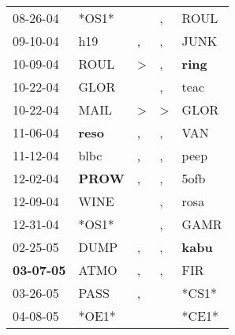 \begin{supertabular}{p{0.07\textwidth}p{0.06\textwidth}p{0.02\textwidth}p{0.02\textwidth}p{0.06\textwidth}}
          08-26-04\textsuperscript{} &                            *OS1* &                  &                , &           ROUL\textsuperscript{} \\
          09-10-04\textsuperscript{} &            h19\textsuperscript{} &                , &                , &           JUNK\textsuperscript{} \\
          10-09-04\textsuperscript{} &           ROUL\textsuperscript{} &     \textgreater &                , &  \textbf{ring\textsuperscript{}} \\
          10-22-04\textsuperscript{} &           GLOR\textsuperscript{} &                  &                , &           teac\textsuperscript{} \\
          10-22-04\textsuperscript{} &           MAIL\textsuperscript{} &     \textgreater &     \textgreater &           GLOR\textsuperscript{} \\
          11-06-04\textsuperscript{} &  \textbf{reso\textsuperscript{}} &                , &                , &            VAN\textsuperscript{} \\
          11-12-04\textsuperscript{} &           blbc\textsuperscript{} &                , &                , &           peep\textsuperscript{} \\
          12-02-04\textsuperscript{} &  \textbf{PROW\textsuperscript{}} &                , &                , &           5ofb\textsuperscript{} \\
          12-09-04\textsuperscript{} &           WINE\textsuperscript{} &                  &                , &           rosa\textsuperscript{} \\
          12-31-04\textsuperscript{} &                            *OS1* &                  &                , &           GAMR\textsuperscript{} \\
          02-25-05\textsuperscript{} &           DUMP\textsuperscript{} &                , &                , &  \textbf{kabu\textsuperscript{}} \\
 \textbf{03-07-05\textsuperscript{}} &           ATMO\textsuperscript{} &                , &                , &            FIR\textsuperscript{} \\
          03-26-05\textsuperscript{} &           PASS\textsuperscript{} &                , &                  &                            *CS1* \\
          04-08-05\textsuperscript{} &                            *OE1* &                  &                  &                            *CE1* \\

\end{supertabular}
